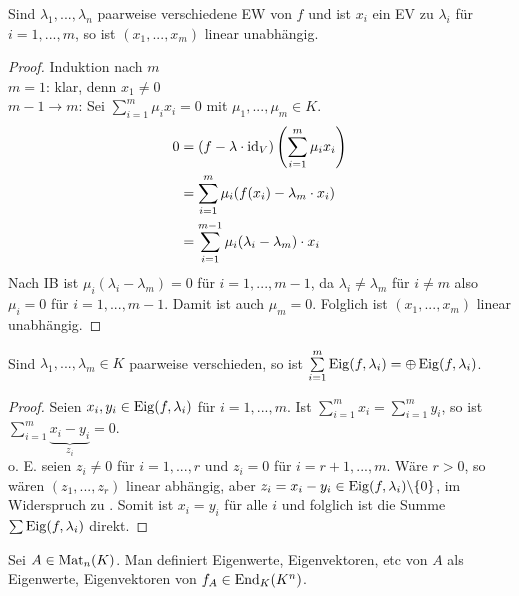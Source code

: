 \begin{lemma}
	Sind $\lambda_1,...,\lambda_n$ paarweise verschiedene EW von $f$ und ist $x_i$ ein EV zu $\lambda_i$ für $i=1,...,m$, so ist $(x_1,...,x_m)$ linear unabhängig.
\end{lemma}
\begin{proof}
	Induktion nach $m$\\
	\emph{$m=1$}: klar, denn $x_1\neq 0$ \\
	\emph{$m-1\to m$}: Sei $\sum\limits_{i=1}^m \mu_i x_i=0$ mit $\mu_1,...,\mu_m\in K$.
	\begin{align}
		0&= (f-\lambda\cdot\operatorname{id}_V)\left( \sum\limits_{i=1}^m \mu_i x_i\right) \notag \\
		&= \sum\limits_{i=1}^m \mu_i(f(x_i)-\lambda_m\cdot x_i) \notag \\
		&= \sum\limits_{i=1}^{m-1} \mu_i(\lambda_i-\lambda_m)\cdot x_i \notag
	\end{align} 
	Nach IB ist $\mu_i(\lambda_i-\lambda_m)=0$ für $i=1,...,m-1$, da $\lambda_i\neq\lambda_m$ für $i\neq m$ also $\mu_i=0$ für $i=1,...,m-1$. Damit ist auch $\mu_m=0$. Folglich ist $(x_1,...,x_m)$ linear unabhängig.
\end{proof}

\begin{proposition}
	Sind $\lambda_1,...,\lambda_m\in K$ paarweise verschieden, so ist $\sum\limits_{i=1}^m \operatorname{Eig}(f,\lambda_i)=\oplus\operatorname{Eig}(f,\lambda_i)$.
\end{proposition}
\begin{proof}
	Seien $x_i,y_i\in\operatorname{Eig}(f,\lambda_i)$ für $i=1,...,m$. Ist $\sum\limits_{i=1}^m x_i=\sum\limits_{i=1}^m y_i$, so ist $\sum\limits_{i=1}^m \underbrace{x_i-y_i}_{z_i}=0$.\\
	o. E. seien $z_i\neq 0$ für $i=1,...,r$ und $z_i=0$ für $i=r+1,...,m$. Wäre $r>0$, so wären $(z_1,...,z_r)$ linear abhängig, aber $z_i=x_i-y_i\in\operatorname{Eig}(f,\lambda_i)\backslash\{0\}$, im Widerspruch zu . Somit ist $x_i=y_i$ für alle $i$ und folglich ist die Summe $\sum\operatorname{Eig}(f,\lambda_i)$ direkt.
\end{proof}

\begin{definition}
	Sei $A\in\operatorname{Mat}_n(K)$. Man definiert Eigenwerte, Eigenvektoren, etc von $A$ als Eigenwerte, Eigenvektoren von $f_A\in\operatorname{End}_K(K^n)$.
\end{definition}

